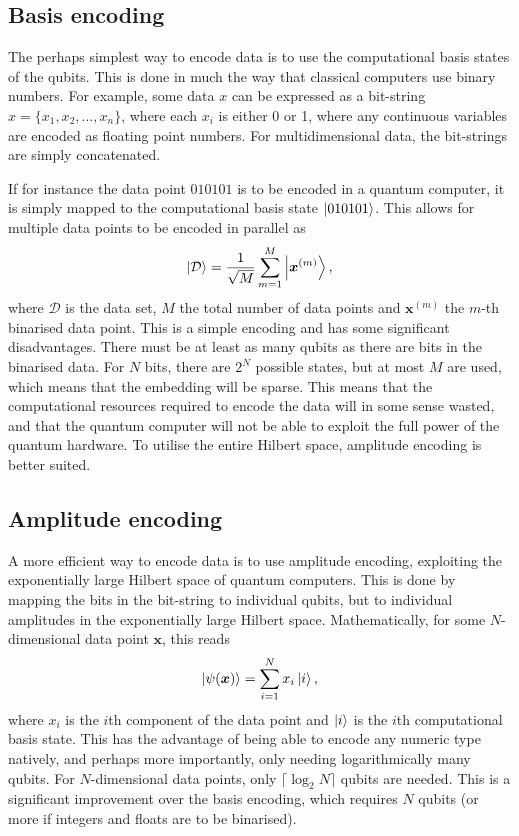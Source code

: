 \subsection{Basis encoding}
The perhaps simplest way to encode data is to use the computational basis states of the qubits.
This is done in much the way that classical computers use binary numbers.
For example, some data $x$ can be expressed as a bit-string $x = \{x_1, x_2, \dots, x_n\}$, where each $x_i$ is either 0 or 1, where any continuous variables are encoded as floating point numbers.
For multidimensional data, the bit-strings are simply concatenated.

If for instance the data point $010101$ is to be encoded in a quantum computer, it is simply mapped to the computational basis state $\ket{010101}$.
This allows for multiple data points to be encoded in parallel as
\begin{equation}
    \ket{\mathcal{D}} = \frac{1}{\sqrt M} \sum_{m=1}^M \ket{\bm{x}^{(m)}},
\end{equation}
where $\mathcal{D}$ is the data set, $M$ the total number of data points and $\bm{x}^{(m)}$ the $m$-th binarised data point.
This is a simple encoding and has some significant disadvantages.
There must be at least as many qubits as there are bits in the binarised data.
For $N$ bits, there are $2^N$ possible states, but at most $M$ are used, which means that the embedding will be sparse.
This means that the computational resources required to encode the data will in some sense wasted, and that the quantum computer will not be able to exploit the full power of the quantum hardware.
To utilise the entire Hilbert space, amplitude encoding is better suited.

\subsection{Amplitude encoding}
A more efficient way to encode data is to use amplitude encoding, exploiting the exponentially large Hilbert space of quantum computers.
This is done by mapping the bits in the bit-string to individual qubits, but to individual amplitudes in the exponentially large Hilbert space.
Mathematically, for some $N$-dimensional data point $\bm{x}$, this reads
\begin{equation}
    \ket{\psi(\bm{x})} = \sum_{i=1}^{N} x_i \ket{i},
\end{equation}
where $x_i$ is the $i$th component of the data point and $\ket{i}$ is the $i$th computational basis state.
This has the advantage of being able to encode any numeric type natively, and perhaps more importantly, only needing logarithmically many qubits.
For $N$-dimensional data points, only $\lceil \log_2 N \rceil$ qubits are needed.
This is a significant improvement over the basis encoding, which requires $N$ qubits (or more if integers and floats are to be binarised).

